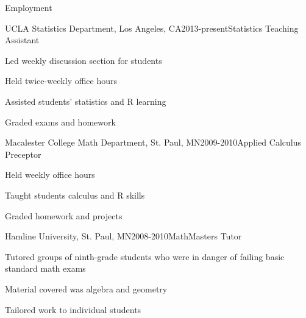 \documentclass{resume} %
\begin{document}
\clearpage
\begin{rSection}{Employment}

\begin{rSubsection}{UCLA Statistics Department, }{Los Angeles, CA}{2013-present}{Statistics Teaching Assistant}
\item Led weekly discussion section for students
\item Held twice-weekly office hours
\item Assisted students' statistics and R learning
\item Graded exams and homework
\end{rSubsection}

\begin{rSubsection}{Macalester College Math Department, }{St. Paul, MN}{2009-2010}{Applied Calculus Preceptor}
\item Held weekly office hours
\item Taught students calculus and R skills
\item Graded homework and projects
\end{rSubsection}

\begin{rSubsection}{Hamline University, }{St. Paul, MN}{2008-2010}{MathMasters Tutor}
\item Tutored groups of ninth-grade students who were in danger of failing basic standard math exams
\item Material covered was algebra and geometry
\item Tailored work to individual students
\end{rSubsection}

\end{rSection}
\end{document}

